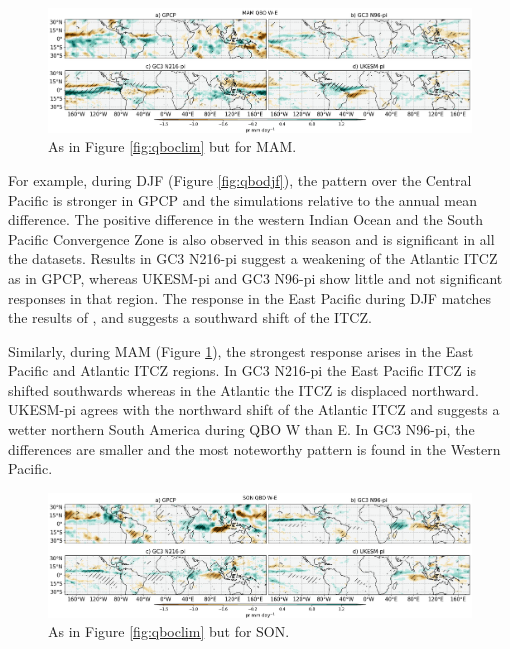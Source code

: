 \begin{figure}[t!]
\centering
 \includegraphics[width=\linewidth]{figures/piprmamqbowqboe.png}
\caption[MAM mean precipitation composite difference QBO W-E ]{ As in Figure \ref{fig:qboclim} but for MAM. }
\label{fig:qbomam}
\end{figure}

For example, during DJF (Figure \ref{fig:qbodjf}), the pattern over the Central Pacific is stronger in GPCP and the simulations relative to the annual mean difference. The positive difference in the western Indian Ocean and the South Pacific Convergence Zone is also observed in this season and is significant in all the datasets. Results in GC3 N216-pi suggest a weakening of the Atlantic ITCZ as in GPCP, whereas UKESM-pi and GC3 N96-pi show little and not significant responses in that region.
The response in the East Pacific during DJF matches the results of \cite{serva2021}, and suggests a southward shift of the ITCZ.


Similarly, during MAM (Figure \ref{fig:qbomam}), the strongest response arises in the East Pacific and Atlantic ITCZ regions. In GC3 N216-pi the East Pacific ITCZ is shifted southwards whereas in the Atlantic the ITCZ is displaced northward. UKESM-pi agrees with the northward shift of the Atlantic ITCZ and suggests a wetter northern South America during QBO W than E. In GC3 N96-pi, the differences are smaller and the most noteworthy pattern is found in the Western Pacific. 


\begin{figure}[t!]
\centering
 \includegraphics[width=\linewidth]{figures/piprsonqbowqboe.png}
\caption[SON mean precipitation composite difference QBO W-E ]{ As in Figure \ref{fig:qboclim} but for SON. }
\label{fig:qboson}
\end{figure}


